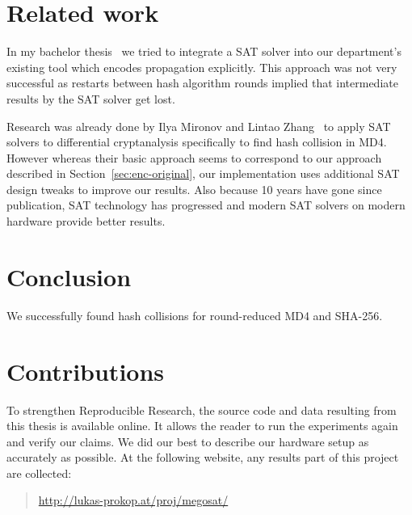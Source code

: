 \section{Related work}
\label{sec:results-related}
%
In my bachelor thesis~\cite{bach} we tried to integrate a SAT solver into
our department's existing tool which encodes propagation explicitly. This approach
was not very successful as restarts between hash algorithm rounds implied that
intermediate results by the SAT solver get lost.

Research was already done by Ilya Mironov and Lintao Zhang~\cite{mironov2006applications}
to apply SAT solvers to differential cryptanalysis specifically to find hash collision
in MD4. However whereas their basic approach seems to correspond to our approach described
in Section~\ref{sec:enc-original}, our implementation uses additional SAT design tweaks
to improve our results. Also because 10 years have gone since publication, SAT technology
has progressed and modern SAT solvers on modern hardware provide better results.

\section{Conclusion}
\label{sec:conclusion}

We successfully found hash collisions for round-reduced MD4 and SHA-256.

\section{Contributions}
\label{sec:contributions}
%
To strengthen Reproducible Research, the source code and data resulting from this thesis is available online.
It allows the reader to run the experiments again and verify our claims.
We did our best to describe our hardware setup as accurately as possible.
At the following website, any results part of this project are collected:

\begin{quote}
  \url{http://lukas-prokop.at/proj/megosat/}
\end{quote}

